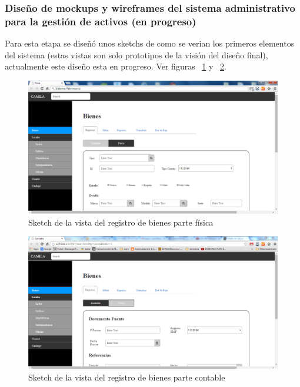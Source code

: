 \subsubsection{Diseño de mockups y wireframes del sistema administrativo para la gestión de activos (en progreso)}

Para esta etapa se diseñó unos sketchs de como se verian los primeros elementos del sistema (estas vistas son solo prototipos de la visión del diseño final), actualmente este diseño esta en progreso. Ver figuras ~\ref{fig:sketch1} y ~\ref{fig:sketch2}.

\begin{figure}
  \centering
  \includegraphics[scale=0.47]{images/activities/camila/sketch-1.png}
  \caption{Sketch de la vista del registro de bienes parte física}
  \label{fig:sketch1}
\end{figure}

\begin{figure}
  \centering
  \includegraphics[scale=0.38]{images/activities/camila/sketch-2.png}
  \caption{Sketch de la vista del registro de bienes parte contable}
  \label{fig:sketch2}
\end{figure}

